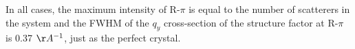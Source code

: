 \documentclass{article}
\begin{document}
  In all cases, the maximum intensity of R-$\pi$ is equal to the number of
  scatterers in the system and the FWHM of the $q_y$ cross-section of the
  structure factor at R-$\pi$ is 0.37 $\AA^{-1}$, just as the perfect crystal. 
 


  


\end{document}
